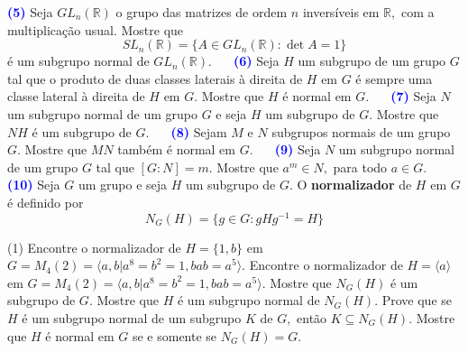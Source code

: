 \documentclass[12pt, a4paper]{article}
\newcommand{\negrito}[1]{\mbox{\boldmath{$#1$}}}
\begin{document}
\textcolor{blue}{\bf(5)}\label{43} Seja $GL_n(\mathbb{R})$ o grupo das matrizes de ordem $n$ inversíveis em $\mathbb{R},$ com a multiplicação usual. Mostre que
\[
SL_n(\mathbb{R}) = \{ A \in GL_n(\mathbb{R}) : \det A = 1 \}
\]
é um subgrupo normal de $GL_n(\mathbb{R}).$
\textcolor{white}{Oi}\newline\newline
\textcolor{blue}{\bf(6)}\label{44} Seja $H$ um subgrupo de um grupo $G$ tal que o produto de duas classes laterais à direita de $H$ em $G$ é sempre uma classe lateral à direita de $H$ em $G.$ Mostre que $H$ é normal em $G.$
\textcolor{white}{Oi}\newline\newline
\textcolor{blue}{\bf(7)}\label{45} Seja $N$ um subgrupo normal de um grupo $G$ e seja $H$ um subgrupo de $G.$ Mostre que $NH$ é um subgrupo de $G.$
\textcolor{white}{Oi}\newline\newline
\textcolor{blue}{\bf(8)}\label{46}  Sejam $M$ e $N$ subgrupos normais de um grupo $G.$ Mostre que $MN$ também é normal em $G.$
\textcolor{white}{Oi}\newline\newline
\textcolor{blue}{\bf(9)}\label{47} Seja $N$ um subgrupo normal de um grupo $G$ tal que $[G : N] = m.$ Mostre que $a^m \in N,$ para todo $a \in G.$
\textcolor{white}{Oi}\newline\newline
\textcolor{blue}{\bf(10)}\label{48} Seja $G$ um grupo e seja $H$ um subgrupo de $G.$ O \textbf{normalizador} de $H$ em $G$ é definido por
\[
N_G(H) = \{g \in G : gHg^{-1} = H \}
\]
\begin{tasks}[counter-format={(tsk[a])},label-width=3.6ex, label-format = {\bfseries}, column-sep = {0pt}](1)
\task[\textcolor{Floresta}{$\negrito{(a)} $}] Encontre o normalizador de $H = \{1, b \}$ em $G = M_4(2) = \langle a,b | a^8 = b^2 = 1, bab = a^5 \rangle.$
\task[\textcolor{Floresta}{$\negrito{(b)} $}] Encontre o normalizador de $H = \langle a \rangle$ em $G = M_4(2) = \langle a,b | a^8 = b^2 = 1, bab = a^5 \rangle.$
\task[\textcolor{Floresta}{$\negrito{(c)} $}] Mostre que $N_G(H)$ é um subgrupo de $G.$ 
\task[\textcolor{Floresta}{$\negrito{(d)} $}] Mostre que $H$ é um subgrupo normal de $N_G(H).$ 
\task[\textcolor{Floresta}{$\negrito{(e)} $}] Prove que se $H$ é um subgrupo normal de um subgrupo $K$ de $G,$ então $K \subseteq N_G(H).$
\task[\textcolor{Floresta}{$\negrito{(f)} $}] Mostre que $H$ é normal em $G$ se e somente se $N_G(H) = G.$
\end{tasks}
\end{document}

